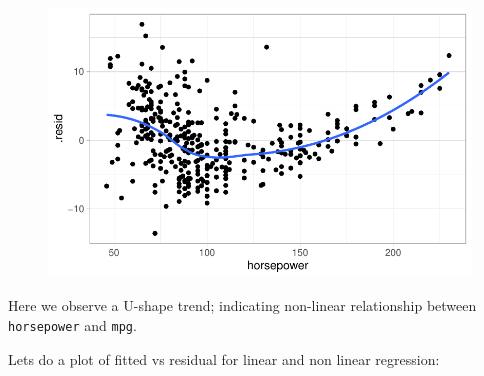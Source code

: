 \documentclass[
  letterpaper,
  DIV=11,
  numbers=noendperiod]{scrreprt}
\begin{document}
\begin{figure}[H]

{\centering \includegraphics{Chapter3_files/figure-pdf/unnamed-chunk-94-1.pdf}

}

\end{figure}

Here we observe a U-shape trend; indicating non-linear relationship
between \texttt{horsepower} and \texttt{mpg}.

Lets do a plot of fitted vs residual for linear and non linear
regression:
\end{document}

